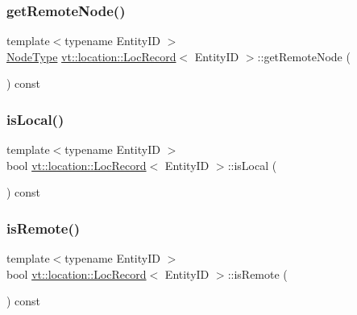 \mbox{\label{structvt_1_1location_1_1_loc_record_ada9c469d3fd01a0eaed1af3a99fc9b2c}} 
\subsubsection{\texorpdfstring{get\+Remote\+Node()}{getRemoteNode()}}
{\footnotesize\ttfamily template$<$typename Entity\+ID $>$ \\
\hyperlink{namespacevt_a866da9d0efc19c0a1ce79e9e492f47e2}{Node\+Type} \hyperlink{structvt_1_1location_1_1_loc_record}{vt\+::location\+::\+Loc\+Record}$<$ Entity\+ID $>$\+::get\+Remote\+Node (\begin{DoxyParamCaption}{ }\end{DoxyParamCaption}) const}

\mbox{\label{structvt_1_1location_1_1_loc_record_af3bb2160b4ad36664ef47171cf6d58a4}} 
\subsubsection{\texorpdfstring{is\+Local()}{isLocal()}}
{\footnotesize\ttfamily template$<$typename Entity\+ID $>$ \\
bool \hyperlink{structvt_1_1location_1_1_loc_record}{vt\+::location\+::\+Loc\+Record}$<$ Entity\+ID $>$\+::is\+Local (\begin{DoxyParamCaption}{ }\end{DoxyParamCaption}) const}

\mbox{\label{structvt_1_1location_1_1_loc_record_a891b73a9c0092f6b022514309190cc8e}} 
\subsubsection{\texorpdfstring{is\+Remote()}{isRemote()}}
{\footnotesize\ttfamily template$<$typename Entity\+ID $>$ \\
bool \hyperlink{structvt_1_1location_1_1_loc_record}{vt\+::location\+::\+Loc\+Record}$<$ Entity\+ID $>$\+::is\+Remote (\begin{DoxyParamCaption}{ }\end{DoxyParamCaption}) const}

